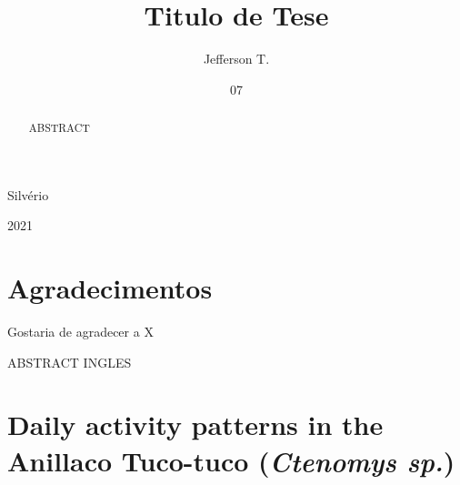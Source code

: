 \documentclass[english,msc,numbers,hidelinks]{coppe}
\begin{document}
  \title{Titulo de Tese}
    \author{Jefferson T.}{Silvério}
  

  \date{07}{2021}
    
  \maketitle

  \frontmatter
  
  \dedication{A alguém cujo valor é digno desta dedicatória.}
    \chapter*{Agradecimentos}
  Gostaria de agradecer a X
  
  \begin{abstract}
  ABSTRACT
  \end{abstract}
  \pagebreak
  \begin{foreignabstract}
  ABSTRACT INGLES
  \end{foreignabstract}
  \tableofcontents
  
    \listoffigures
  
    \listoftables
  
  \printlosymbols
  \printloabbreviations

  \mainmatter
  \hypertarget{daily-activity-patterns-in-the-anillaco-tuco-tuco-ctenomys-sp.}{%
  \chapter{\texorpdfstring{Daily activity patterns in the Anillaco Tuco-tuco (\emph{Ctenomys sp.})}{Daily activity patterns in the Anillaco Tuco-tuco (Ctenomys sp.)}}\label{daily-activity-patterns-in-the-anillaco-tuco-tuco-ctenomys-sp.}}
\end{document}
